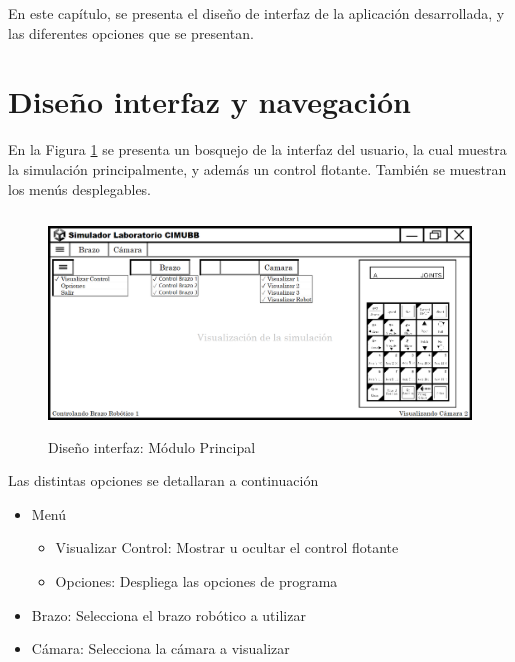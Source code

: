 En este capítulo, se presenta el diseño de interfaz de la aplicación desarrollada, y las diferentes opciones que se presentan.
\section{Diseño interfaz y navegación}

En la Figura \ref{fig:Mockup} se presenta un bosquejo de la interfaz del usuario, la cual muestra la simulación principalmente, y además un control flotante. También se muestran los menús desplegables.
\begin{figure}[h]
\centering
\includegraphics[height=5.82cm]{figures/Mockup.png}
\caption{Diseño interfaz: Módulo Principal}
\label{fig:Mockup}
\end{figure}

Las distintas opciones se detallaran a continuación
\begin{itemize}
\item Menú
    \begin{itemize}
    \item Visualizar Control: Mostrar u ocultar el control flotante
    \item Opciones: Despliega las opciones de programa
    \end{itemize}
\item Brazo: Selecciona el brazo robótico a utilizar
\item Cámara: Selecciona la cámara a visualizar
\end{itemize}
